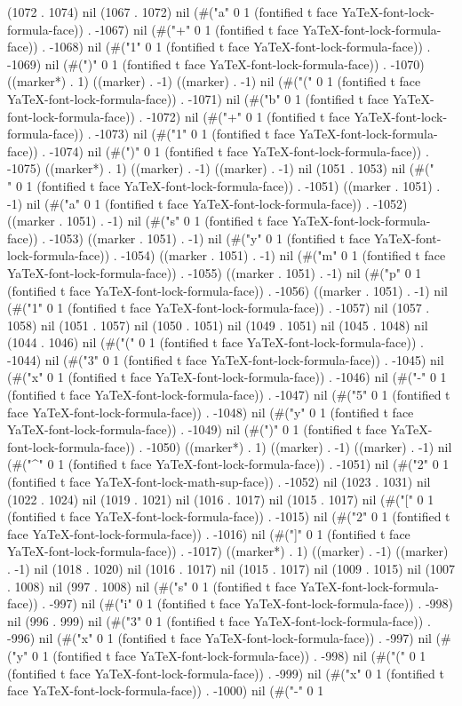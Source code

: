 (1072 . 1074) nil (1067 . 1072) nil (#("a" 0 1 (fontified t face YaTeX-font-lock-formula-face)) . -1067) nil (#("+" 0 1 (fontified t face YaTeX-font-lock-formula-face)) . -1068) nil (#("1" 0 1 (fontified t face YaTeX-font-lock-formula-face)) . -1069) nil (#(")" 0 1 (fontified t face YaTeX-font-lock-formula-face)) . -1070) ((marker*) . 1) ((marker) . -1) ((marker) . -1) nil (#("(" 0 1 (fontified t face YaTeX-font-lock-formula-face)) . -1071) nil (#("b" 0 1 (fontified t face YaTeX-font-lock-formula-face)) . -1072) nil (#("+" 0 1 (fontified t face YaTeX-font-lock-formula-face)) . -1073) nil (#("1" 0 1 (fontified t face YaTeX-font-lock-formula-face)) . -1074) nil (#(")" 0 1 (fontified t face YaTeX-font-lock-formula-face)) . -1075) ((marker*) . 1) ((marker) . -1) ((marker) . -1) nil (1051 . 1053) nil (#("\\" 0 1 (fontified t face YaTeX-font-lock-formula-face)) . -1051) ((marker . 1051) . -1) nil (#("a" 0 1 (fontified t face YaTeX-font-lock-formula-face)) . -1052) ((marker . 1051) . -1) nil (#("s" 0 1 (fontified t face YaTeX-font-lock-formula-face)) . -1053) ((marker . 1051) . -1) nil (#("y" 0 1 (fontified t face YaTeX-font-lock-formula-face)) . -1054) ((marker . 1051) . -1) nil (#("m" 0 1 (fontified t face YaTeX-font-lock-formula-face)) . -1055) ((marker . 1051) . -1) nil (#("p" 0 1 (fontified t face YaTeX-font-lock-formula-face)) . -1056) ((marker . 1051) . -1) nil (#("1" 0 1 (fontified t face YaTeX-font-lock-formula-face)) . -1057) nil (1057 . 1058) nil (1051 . 1057) nil (1050 . 1051) nil (1049 . 1051) nil (1045 . 1048) nil (1044 . 1046) nil (#("(" 0 1 (fontified t face YaTeX-font-lock-formula-face)) . -1044) nil (#("3" 0 1 (fontified t face YaTeX-font-lock-formula-face)) . -1045) nil (#("x" 0 1 (fontified t face YaTeX-font-lock-formula-face)) . -1046) nil (#("-" 0 1 (fontified t face YaTeX-font-lock-formula-face)) . -1047) nil (#("5" 0 1 (fontified t face YaTeX-font-lock-formula-face)) . -1048) nil (#("y" 0 1 (fontified t face YaTeX-font-lock-formula-face)) . -1049) nil (#(")" 0 1 (fontified t face YaTeX-font-lock-formula-face)) . -1050) ((marker*) . 1) ((marker) . -1) ((marker) . -1) nil (#("^" 0 1 (fontified t face YaTeX-font-lock-formula-face)) . -1051) nil (#("2" 0 1 (fontified t face YaTeX-font-lock-math-sup-face)) . -1052) nil (1023 . 1031) nil (1022 . 1024) nil (1019 . 1021) nil (1016 . 1017) nil (1015 . 1017) nil (#("[" 0 1 (fontified t face YaTeX-font-lock-formula-face)) . -1015) nil (#("2" 0 1 (fontified t face YaTeX-font-lock-formula-face)) . -1016) nil (#("]" 0 1 (fontified t face YaTeX-font-lock-formula-face)) . -1017) ((marker*) . 1) ((marker) . -1) ((marker) . -1) nil (1018 . 1020) nil (1016 . 1017) nil (1015 . 1017) nil (1009 . 1015) nil (1007 . 1008) nil (997 . 1008) nil (#("s" 0 1 (fontified t face YaTeX-font-lock-formula-face)) . -997) nil (#("i" 0 1 (fontified t face YaTeX-font-lock-formula-face)) . -998) nil (996 . 999) nil (#("3" 0 1 (fontified t face YaTeX-font-lock-formula-face)) . -996) nil (#("x" 0 1 (fontified t face YaTeX-font-lock-formula-face)) . -997) nil (#("y" 0 1 (fontified t face YaTeX-font-lock-formula-face)) . -998) nil (#("(" 0 1 (fontified t face YaTeX-font-lock-formula-face)) . -999) nil (#("x" 0 1 (fontified t face YaTeX-font-lock-formula-face)) . -1000) nil (#("-" 0 1 